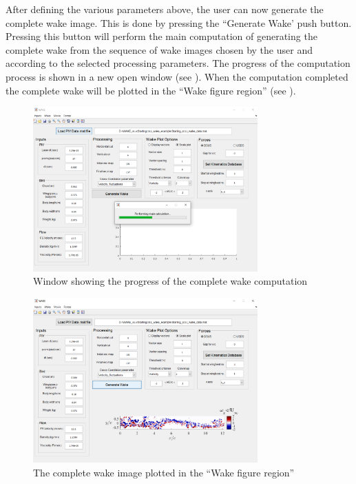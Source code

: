 \documentclass[12pt,a4paper]{article}
\begin{document}
  After defining the various parameters above, the user can now generate the complete wake image. This is done by pressing the ``Generate Wake' push button. Pressing this button will perform the main computation of generating the complete wake from the sequence of wake images chosen by the user and according to the selected processing parameters. The progress of the computation process is shown in a new open window (see ). When the computation completed the complete wake will be plotted in the ``Wake figure region'' (see ).  
  
\begin{figure}[ht!]
	\centering
	\includegraphics[width=0.77\textwidth]{Generating_Wake_processing}
	\caption{Window showing the progress of the complete wake computation}
	\label{fig:GUI-generating-wake-progress}
\end{figure}
  
\begin{figure}[ht!]
	\centering
	\includegraphics[width=0.77\textwidth]{wake-generated}
	\caption{The complete wake image plotted in the ``Wake figure region''}
	\label{fig:GUI-wake-generated}
\end{figure}
 
\end{document}
